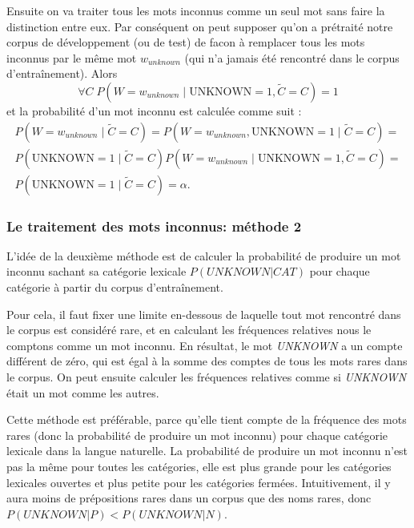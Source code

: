 \documentclass[12pt]{article}
\begin{document}
Ensuite on va traiter tous les mots inconnus comme un seul mot sans faire la
distinction entre eux.
Par cons\'equent on peut supposer qu'on a pr\'etrait\'e notre corpus de
d\'eveloppement (ou de test) de facon \`a remplacer tous les mots inconnus par le
m\^eme mot $w_{unknown}$ (qui n'a jamais \'et\'e rencontr\'e dans le corpus
d'entra\^inement). Alors $$\forall C \; P(W = w_{unknown} \mid \mathrm{UNKNOWN} =
1, \tilde{C} = C) = 1$$ et la probabilit\'e d'un mot inconnu est calcul\'ee comme
suit :
\begin{multline}
\label{prob_mot_inconnu_1}
 P(W = w_{unknown} \mid \tilde{C} = C) = P(W = w_{unknown}, \mathrm{UNKNOWN} = 1
 \mid \tilde{C} = C) = \\ P(\mathrm{UNKNOWN} = 1 \mid \tilde{C} = C) P(W =
 w_{unknown} \mid \mathrm{UNKNOWN} = 1, \tilde{C} = C) = \\ P(\mathrm{UNKNOWN} =
 1 \mid \tilde{C} = C) = \alpha.
\end{multline}

\subsubsection{Le traitement des mots inconnus: m\'ethode 2}

L'id\'ee de la deuxi\`eme m\'ethode est de calculer la probabilit\'e de
produire un mot inconnu sachant sa cat\'egorie lexicale $P(UNKNOWN|CAT)$ pour
chaque cat\'egorie \`a partir du corpus d'entra\^inement.\par

Pour cela, il faut fixer une limite en-dessous de laquelle tout mot rencontr\'e dans le corpus est
consid\'er\'e rare, et en calculant les fr\'equences relatives nous le comptons comme
un mot inconnu. En r\'esultat, le mot \textit{UNKNOWN} a un compte diff\'erent de z\'ero, qui
est \'egal \`a la somme des comptes de tous les mots rares dans le corpus. On peut
ensuite calculer les fr\'equences relatives comme si \textit{UNKNOWN} \'etait un mot comme
les autres.
\par

Cette m\'ethode est pr\'ef\'erable, parce qu'elle tient compte de la
fr\'equence des mots rares (donc la probabilit\'e de produire un mot inconnu) pour
chaque cat\'egorie lexicale dans la langue naturelle. La probabilit\'e
de produire un mot inconnu n'est pas la m\^eme pour toutes les
cat\'egories, elle est plus grande pour les cat\'egories lexicales ouvertes et plus
petite pour les cat\'egories ferm\'ees.
Intuitivement, il y aura moins de pr\'epositions rares dans un corpus que des noms rares, donc $P(UNKNOWN|P) < P(UNKNOWN|N)$.
\par
\end{document}
